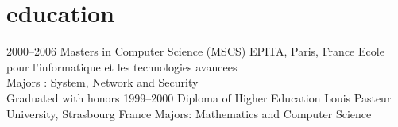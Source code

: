 \documentclass[]{friggeri-cv} %
\begin{document}
\section{education}

\begin{entrylist}
\entry
{2000--2006}
{Masters {\normalfont in Computer Science (MSCS)}}
{EPITA, Paris, France}
{Ecole pour l’informatique et les technologies avancees\\
Majors : System, Network and Security\\
Graduated with honors}
\entry
{1999--2000}
{Diploma {\normalfont of Higher Education}}
{Louis Pasteur University, Strasbourg France}
{Majors: Mathematics and Computer Science}
\end{entrylist}
\end{document}
